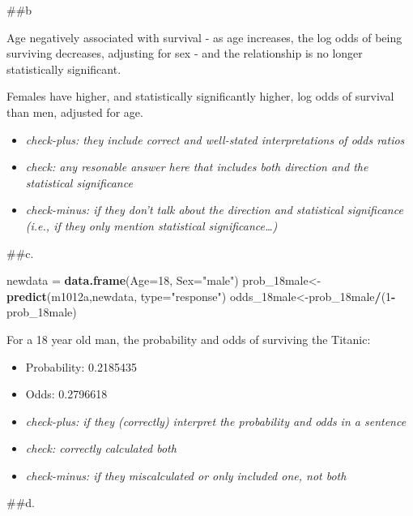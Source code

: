 \documentclass[]{article}
\newenvironment{Shaded}{\begin{snugshade}}{\end{snugshade}}
\newcommand{\DataTypeTok}[1]{\textcolor[rgb]{0.13,0.29,0.53}{#1}}
\newcommand{\DecValTok}[1]{\textcolor[rgb]{0.00,0.00,0.81}{#1}}
\newcommand{\KeywordTok}[1]{\textcolor[rgb]{0.13,0.29,0.53}{\textbf{#1}}}
\newcommand{\NormalTok}[1]{#1}
\newcommand{\OperatorTok}[1]{\textcolor[rgb]{0.81,0.36,0.00}{\textbf{#1}}}
\newcommand{\StringTok}[1]{\textcolor[rgb]{0.31,0.60,0.02}{#1}}
\providecommand{\tightlist}{%
  \setlength{\itemsep}{0pt}\setlength{\parskip}{0pt}}
\begin{document}
\#\#b

Age negatively associated with survival - as age increases, the log odds
of being surviving decreases, adjusting for sex - and the relationship
is no longer statistically significant.

Females have higher, and statistically significantly higher, log odds of
survival than men, adjusted for age.

\begin{itemize}
\tightlist
\item
  \emph{check-plus: they include correct and well-stated interpretations
  of odds ratios}
\item
  \emph{check: any resonable answer here that includes both direction
  and the statistical significance}
\item
  \emph{check-minus: if they don't talk about the direction \emph{and}
  statistical significance (i.e., if they only mention statistical
  significance\ldots{})}
\end{itemize}

\#\#c.

\begin{Shaded}
\begin{Highlighting}[]
\NormalTok{newdata =}\StringTok{ }\KeywordTok{data.frame}\NormalTok{(}\DataTypeTok{Age=}\DecValTok{18}\NormalTok{, }\DataTypeTok{Sex=}\StringTok{"male"}\NormalTok{)}
\NormalTok{prob_18male<-}\KeywordTok{predict}\NormalTok{(m1012a,newdata, }\DataTypeTok{type=}\StringTok{"response"}\NormalTok{)}
\NormalTok{odds_18male<-prob_18male}\OperatorTok{/}\NormalTok{(}\DecValTok{1}\OperatorTok{-}\NormalTok{prob_18male)}
\end{Highlighting}
\end{Shaded}

For a 18 year old man, the probability and odds of surviving the
Titanic:

\begin{itemize}
\item
  Probability: 0.2185435
\item
  Odds: 0.2796618
\item
  \emph{check-plus: if they (correctly) interpret the probability and
  odds in a sentence}
\item
  \emph{check: correctly calculated both}
\item
  \emph{check-minus: if they miscalculated \emph{or} only included one,
  not both}
\end{itemize}

\#\#d.
\end{document}
